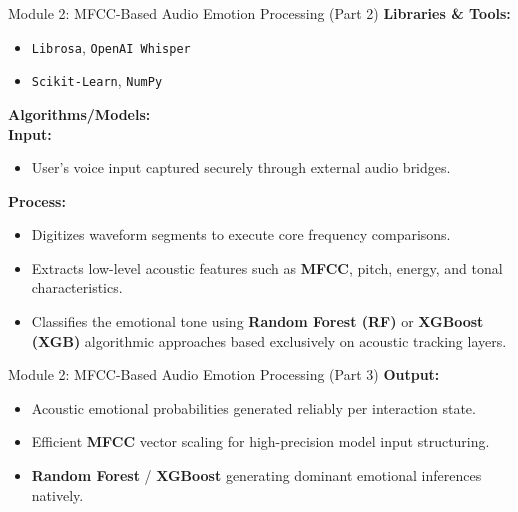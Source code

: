 \documentclass{beamer}
\begin{document}
\begin{frame}{Module 2: MFCC-Based Audio Emotion Processing (Part 2)}
\textbf{Libraries \& Tools:}
\begin{itemize}
    \item \texttt{Librosa}, \texttt{OpenAI Whisper}
    \item \texttt{Scikit-Learn}, \texttt{NumPy}
\end{itemize}

\vspace{0.3cm}
\textbf{Algorithms/Models:}
\\
\textbf{Input:}
\begin{itemize}
    \item User’s voice input captured securely through external audio bridges.
\end{itemize}

\textbf{Process:}
\begin{itemize}
    \item Digitizes waveform segments to execute core frequency comparisons.
    \item Extracts low-level acoustic features such as \textbf{MFCC}, pitch, energy, and tonal characteristics.
    \item Classifies the emotional tone using \textbf{Random Forest (RF)} or \textbf{XGBoost (XGB)} algorithmic approaches based exclusively on acoustic tracking layers.
\end{itemize}
\end{frame}
\begin{frame}{Module 2: MFCC-Based Audio Emotion Processing (Part 3)}
\textbf{Output:}
\begin{itemize}
    \item Acoustic emotional probabilities generated reliably per interaction state.
\end{itemize}
\begin{itemize}
    \item Efficient \textbf{MFCC} vector scaling for high-precision model input structuring.
    \item \textbf{Random Forest} / \textbf{XGBoost} generating dominant emotional inferences natively.
\end{itemize}
\end{frame}
\end{document}
